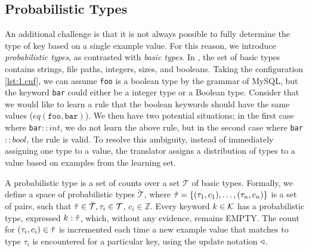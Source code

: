 \subsection{Probabilistic Types}
\label{sec:ptypes}
An additional challenge is that it is not always possible to fully determine the type of key based on a single example value. 
For this reason, we introduce \textit{probabilistic types}, as contrasted with \textit{basic types}.
In \app, the set of basic types contains strings, file paths, integers, sizes, and booleans. 
Taking the configuration \ref{lst:1.cnf}, we can assume {\tt foo} is a boolean type by the grammar of MySQL,
  but the keyword {\tt bar} could either be a integer type or a Boolean type.
Consider that we would like to learn a rule that the boolean keywords should have the same values ($eq(\texttt{foo},\texttt{bar})$).
We then have two potential situations; in the first case where {\tt bar}$::int$, we do not learn the above rule, but in the second case where {\tt bar}$::bool$, the rule is valid.
To resolve this ambiguity, instead of immediately assigning one type to a value, the translator assigns a distribution of types to a value based on examples from the learning set.

A probabilistic type is a set of counts over a set $\mathcal{T}$ of basic types.
Formally, we define a space of probabilistic types $\tilde{\mathcal{T}}$, where $\tilde{\tau}=\{(\tau_1, c_1),\ldots,(\tau_n, c_n)\}$ is a set of pairs, such that $\tilde{\tau} \in \tilde{\mathcal{T}}, \tau_i \in \mathcal{T}$, $c_i \in \mathbb{Z}$. 
Every keyword $k\in\mathcal{K}$ has a probabilistic type, expressed $k:\tilde{\tau}$, which, without any evidence, remains {\scriptsize EMPTY}.
The count for $(\tau_i,c_i) \in \tilde{\tau}$ is incremented each time a new example value that matches to type $\tau_i$ is encountered for a particular key, using the update notation $\triangleleft$.


